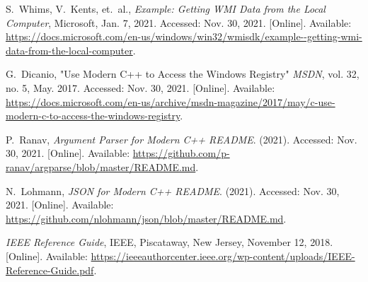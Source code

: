 \documentclass[conference]{IEEEtran}
\begin{document}
\begin{thebibliography}{2}

S.~Whims, V.~Kents, et.~al., \textit{Example: Getting WMI Data from the Local Computer}, Microsoft, Jan. 7, 2021. Accessed: Nov. 30, 2021. [Online]. Available: \url{https://docs.microsoft.com/en-us/windows/win32/wmisdk/example--getting-wmi-data-from-the-local-computer}.

G.~Dicanio, "Use Modern C++ to Access the Windows Registry" \textit{MSDN}, vol. 32, no. 5, May. 2017. Accessed: Nov. 30, 2021. [Online]. Available: \url{https://docs.microsoft.com/en-us/archive/msdn-magazine/2017/may/c-use-modern-c-to-access-the-windows-registry}.

P.~Ranav, \textit{Argument Parser for Modern C++ README}. (2021). Accessed: Nov. 30, 2021. [Online]. Available: \url{https://github.com/p-ranav/argparse/blob/master/README.md}.

N.~Lohmann, \textit{JSON for Modern C++ README}. (2021). Accessed: Nov. 30, 2021. [Online]. Available: \url{https://github.com/nlohmann/json/blob/master/README.md}.

\textit{IEEE Reference Guide}, IEEE, Piscataway, New Jersey, November 12, 2018. [Online]. Available: \url{https://ieeeauthorcenter.ieee.org/wp-content/uploads/IEEE-Reference-Guide.pdf}.

\end{thebibliography}
\end{document}
